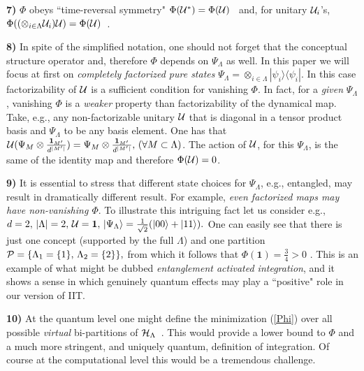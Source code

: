 \documentclass[aps,pra,groupaddress]{revtex4-1}
\begin{document}
{\bf{7)}}  $\Phi$ obeys ``time-reversal symmetry" $\Phi({\cal U}^*)=\Phi({\cal U})$~\cite{time-reversal}  and, for unitary ${\cal U}_i$'s,  $\Phi( (\otimes_{i\in\Lambda}{\cal U}_i){\cal U})=\Phi({\cal U})$~\cite{group-action}.


{\bf{8)}} In spite of the simplified notation, one should not forget that the conceptual structure operator and, therefore $\Phi$ depends on $\Psi_\Lambda$ as well.
In this paper we will focus at first on {\em{completely factorized pure states}} 
$\Psi_\Lambda = \otimes_{i\in\Lambda} |\psi_i\rangle\langle\psi_i|$.
%
In this case factorizability of ${\cal U}$ is a sufficient   condition for vanishing $\Phi.$ In fact, for a {\em{given}} $\Psi_\Lambda$, vanishing $\Phi$
is a {\em{weaker}} property than factorizability of the dynamical map.  Take, e.g., any non-factorizable unitary ${\cal U}$ that is diagonal
in a tensor product basis and $\Psi_\Lambda$ to be any basis element.
One has that ${\cal U}(\Psi_M\otimes \frac{ {\mathbf{1}}_{M^\prime}   } {d^{ |M^\prime|} })=  \Psi_M\otimes \frac{ {\mathbf{1}}_{M^\prime} }{d^{|M^\prime|}},\,(\forall M\subset \Lambda)$.
The action of $\cal U$, for this $\Psi_\Lambda$, is the same of the
identity map and therefore $\Phi({\cal U})=0$.

{\bf{9)}} It is essential  to stress  that different state choices for $\Psi_\Lambda$, e.g., entangled, may result in dramatically
different result. For example, {\em{even factorized maps  may have non-vanishing $\Phi$}}. 
To illustrate this intriguing fact let us consider e.g., $d=2,\,|\Lambda|=2,\,{\cal U}={\mathbf{1}},\,|\Psi_\Lambda\rangle=\frac{1}{\sqrt{2}}(|00\rangle+|11\rangle).$
One can easily see   that  there is just one concept (supported by the full $\Lambda$) and one partition ${\cal P}=\{\Lambda_1=\{1\},\,\Lambda_2=\{2\}\},$ from which it follows   that $\Phi({\mathbf{1}})=\frac{3}{4}>0$ \cite{unp}. This is an example of what might be dubbed {\em{ entanglement activated integration}}, and it  shows a sense in which genuinely quantum effects may play a ``positive" role in our version of IIT.

{\bf{10)}} At the quantum level one might define the minimization (\ref{Phi})
over all possible {\em{virtual}} bi-partitions of
${\cal H}_\Lambda$~\cite{virtual1,virtual2}. This would provide a lower bound to $\Phi$ and a much more stringent,
and uniquely quantum, definition of integration. Of course at the computational level this would be a tremendous challenge.
\end{document}
